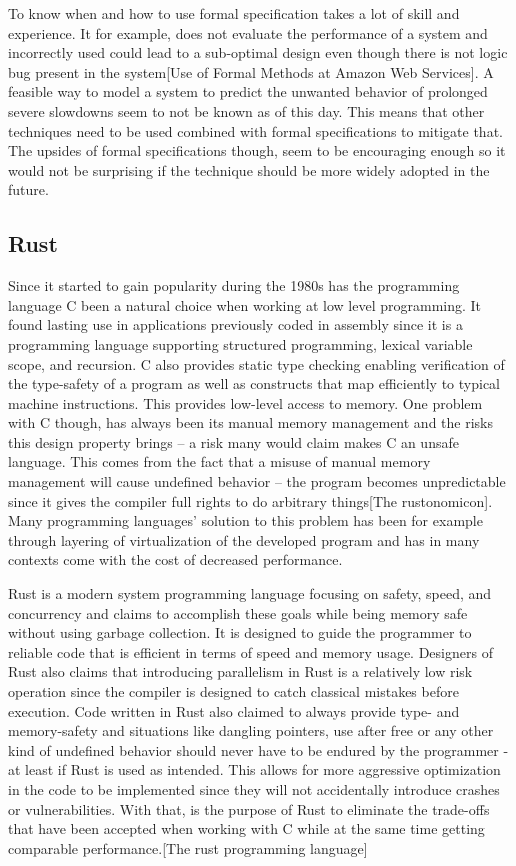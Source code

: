 \documentclass{article}
\begin{document}
To know when and how to use formal specification takes a lot of skill and experience. It for example, does not evaluate the performance of a system and incorrectly used could lead to a sub-optimal design even though there is not logic bug present in the system[Use of Formal Methods at Amazon Web Services]. A feasible way to model a system to predict the unwanted behavior of prolonged severe slowdowns seem to not be known as of this day. This means that other techniques need to be used combined with formal specifications to mitigate that. The upsides of formal specifications though, seem to be encouraging enough so it would not be surprising if the technique should be more widely adopted in the future. 

\subsection{Rust}\label{rust}

Since it started to gain popularity during the 1980s has the programming language C been a natural choice when working at low level programming. It found lasting use in applications previously coded in assembly since it is a programming language supporting structured programming, lexical variable scope, and recursion. C also provides static type checking enabling verification of the type-safety of a program as well as constructs that map efficiently to typical machine instructions. This provides low-level access to memory. One problem with C though, has always been its manual memory management and the risks this design property brings – a risk many would claim makes C an unsafe language. This comes from the fact that a misuse of manual memory management will cause undefined behavior – the program becomes unpredictable since it gives the compiler full rights to do arbitrary things[The rustonomicon]. Many programming languages' solution to this problem has been for example through layering of virtualization of the developed program and has in many contexts come with the cost of decreased performance.

Rust is a modern system programming language focusing on safety, speed, and concurrency and claims to accomplish these goals while being memory safe without using garbage collection. It is designed to guide the programmer to reliable code that is efficient in terms of speed and memory usage. Designers of Rust also claims that introducing parallelism in Rust is a relatively low risk operation since the compiler is designed to catch classical mistakes before execution. Code written in Rust also claimed to always provide type- and memory-safety and situations like dangling pointers, use after free or any other kind of undefined behavior should never have to be endured by the programmer - at least if Rust is used as intended. This allows for more aggressive optimization in the code to be implemented since they will not accidentally introduce crashes or vulnerabilities. With that, is the purpose of Rust to eliminate the trade-offs that have been accepted when working with C while at the same time getting comparable performance.[The rust programming language]
\end{document}
